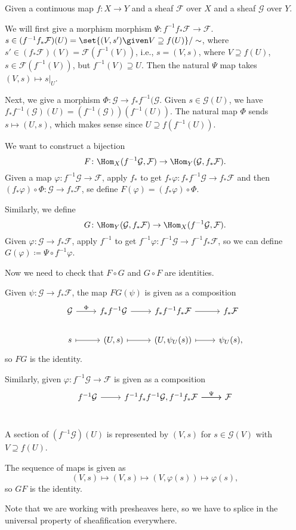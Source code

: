 Given a continuous map $f\colon X\to Y$ and a sheaf $\mathcal{F}$ over $X$ and a sheaf $\mathcal{G}$ over $Y$.

We will first give a morphism morphism $\Psi\colon f^{-1}f_*\mathcal{F}\to \mathcal{F}$.
$s \in (f^{-1}f_*\mathcal{F})(U) = \set{(V, s')\given V\supseteq f(U)}/\sim$,
where $s' \in (f_*\mathcal{F})(V) = \mathcal{F}(f^{-1}(V))$,
i.e., $s = (V, s)$, where $V\supseteq f(U)$, $s \in \mathcal{F}(f^{-1}(V))$, but
$f^{-1}(V) \supseteq U$. Then the natural $\Psi$ map takes $(V, s) \mapsto s|_U$.

Next, we give a morphism $\Phi\colon \mathcal{G}\to f_*f^{-1}(\mathcal{G}$.
Given $s \in \mathcal{G}(U)$, we have $f_*f^{-1}(\mathcal{G})(U) = (f^{-1}(\mathcal{G}))(f^{-1}(U))$.
The natural map $\Phi$ sends $s\mapsto (U, s)$, which makes sense since $U\supseteq f(f^{-1}(U))$.

We want to construct a bijection
\[F\colon \Hom_X(f^{-1}\mathcal{G}, \mathcal{F}) \to \Hom_Y(\mathcal{G}, f_*\mathcal{F}). \]
Given a map $\varphi\colon f^{-1}\mathcal{G}\to \mathcal{F}$, apply $f_*$ to get
$f_*\varphi\colon f_*f^{-1}\mathcal{G}\to f_*\mathcal{F}$ and then $(f_*\varphi)\circ\Phi\colon \mathcal{G}\to f_*\mathcal{F}$,
se define $F(\varphi) = (f_*\varphi)\circ\Phi$.

Similarly, we define \[G\colon \Hom_Y(\mathcal{G}, f_*\mathcal{F})\to \Hom_X(f^{-1}\mathcal{G}, \mathcal{F}). \]
Given $\varphi\colon \mathcal{G}\to f_*\mathcal{F}$, apply $f^{-1}$ to get
$f^{-1}\varphi\colon f^{-1}\mathcal{G}\to f^{-1}f_*\mathcal{F}$, so we can define
$G(\varphi)\coloneqq \Psi \circ f^{-1}\varphi$.

Now we need to check that $F \circ G$ and $G \circ F$ are identities.

Given $\psi\colon \mathcal{G}\to f_*\mathcal{F}$, the map $FG(\psi)$ is given as
a composition
\[\begin{tikzcd}
	\mathcal{G}\ar[r, "\Phi"] &f_*f^{-1}\mathcal{G} \ar[r] & f_*f^{-1}f_*\mathcal{F}\ar[r] & f_*\mathcal{F}\\
	s\ar[r, mapsto] & (U, s)\ar[r, mapsto] & (U, \psi_U(s))\ar[r, mapsto] & \psi_U(s),
\end{tikzcd}\]
so $FG$ is the identity.

Similarly, given $\varphi\colon f^{-1}\mathcal{G}\to \mathcal{F}$ is given as a composition
\[\begin{tikzcd}
	f^{-1}\mathcal{G}\ar[r] & f^{-1}f_*f^{-1}\mathcal{G}\ar[r], f^{-1}f_*\mathcal{F}\ar[r, "\Psi"] & \mathcal{F}\\
\end{tikzcd}\]

A section of $(f^{-1}\mathcal{G})(U)$ is represented by $(V, s)$ for $s \in \mathcal{G}(V)$
with $V\supseteq f(U)$.

The sequence of maps is given as
\[ (V, s)\mapsto (V, s) \mapsto  (V, \varphi(s))\mapsto \varphi(s), \]
so $GF$ is the identity.

Note that we are working with presheaves here, so we have to splice in the universal property of
sheafification everywhere.
